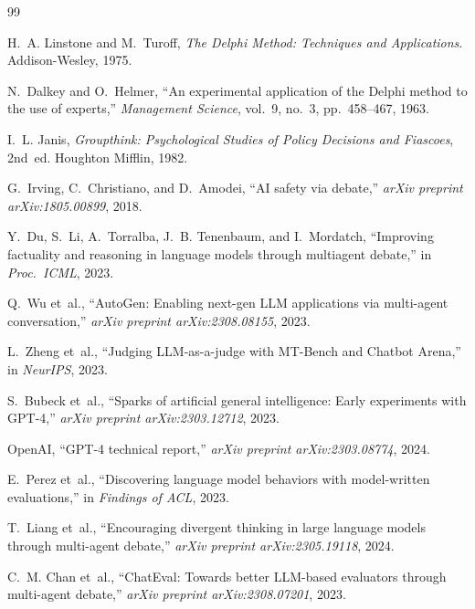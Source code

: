 \documentclass[11pt,a4paper]{article}
\begin{document}
\begin{thebibliography}{99}

H.~A. Linstone and M.~Turoff, \emph{The Delphi Method: Techniques and Applications}. Addison-Wesley, 1975.

N.~Dalkey and O.~Helmer, ``An experimental application of the Delphi method to the use of experts,'' \emph{Management Science}, vol.~9, no.~3, pp.~458--467, 1963.

I.~L. Janis, \emph{Groupthink: Psychological Studies of Policy Decisions and Fiascoes}, 2nd~ed. Houghton Mifflin, 1982.

G.~Irving, C.~Christiano, and D.~Amodei, ``AI safety via debate,'' \emph{arXiv preprint arXiv:1805.00899}, 2018.

Y.~Du, S.~Li, A.~Torralba, J.~B. Tenenbaum, and I.~Mordatch, ``Improving factuality and reasoning in language models through multiagent debate,'' in \emph{Proc.\ ICML}, 2023.

Q.~Wu et~al., ``AutoGen: Enabling next-gen LLM applications via multi-agent conversation,'' \emph{arXiv preprint arXiv:2308.08155}, 2023.

L.~Zheng et~al., ``Judging LLM-as-a-judge with MT-Bench and Chatbot Arena,'' in \emph{NeurIPS}, 2023.

S.~Bubeck et~al., ``Sparks of artificial general intelligence: Early experiments with GPT-4,'' \emph{arXiv preprint arXiv:2303.12712}, 2023.

OpenAI, ``GPT-4 technical report,'' \emph{arXiv preprint arXiv:2303.08774}, 2024.

E.~Perez et~al., ``Discovering language model behaviors with model-written evaluations,'' in \emph{Findings of ACL}, 2023.

T.~Liang et~al., ``Encouraging divergent thinking in large language models through multi-agent debate,'' \emph{arXiv preprint arXiv:2305.19118}, 2024.

C.~M. Chan et~al., ``ChatEval: Towards better LLM-based evaluators through multi-agent debate,'' \emph{arXiv preprint arXiv:2308.07201}, 2023.


\end{thebibliography}
\end{document}
